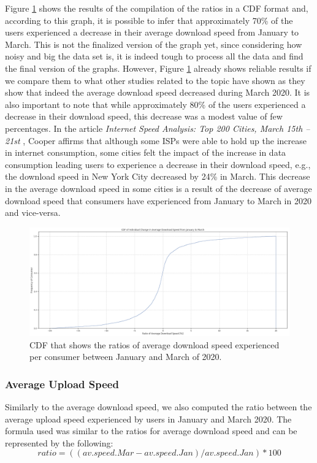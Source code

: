\documentclass[conference,10pt]{IEEEtran}
\begin{document}
Figure \ref{fig:downloadspeed2020} shows the results of the compilation of the ratios in a CDF format and, according to this graph, it is possible to infer that approximately 70\% of the users experienced a decrease in their average download speed from January to March. This is not the finalized version of the graph yet, since considering how noisy and big the data set is, it is indeed tough to process all the data and find the final version of the graphs. However, Figure \ref{fig:downloadspeed2020} already shows reliable results if we compare them to what other studies related to the topic have shown as they show that indeed the average download speed decreased during March 2020. It is also important to note that while approximately 80\% of the users experienced a decrease in their download speed, this decrease was a modest value of few percentages. In the article \textit{Internet Speed Analysis: Top 200 Cities, March 15th – 21st} \cite{cooper}, Cooper affirms that although some ISPs were able to hold up the increase in  internet consumption, some cities felt the impact of the increase in data consumption leading users to experience a decrease in their download speed, e.g., the download speed in New York City decreased by 24\% in March. This decrease in the average download speed in some cities is a result of the decrease of average download speed that consumers have experienced from January to March in 2020 and vice-versa.

\begin{figure}
\centering
\includegraphics[width=1.0\linewidth]{figs/downspeed.PNG}
\caption{CDF that shows the ratios of average download speed experienced per consumer between January and March of 2020.}
\label{fig:downloadspeed2020}
\end{figure}

\subsubsection{Average Upload Speed}
\label{sec:average-upload-speed}
Similarly to the average download speed, we also computed the ratio between the average upload speed experienced by users in January and March 2020. The formula used was similar to the ratios for average download speed and can be represented by the following:
\begin{equation}
ratio= ((av.speed.Mar - av.speed.Jan)/ av.speed.Jan)*100
\end{equation}
\end{document}
